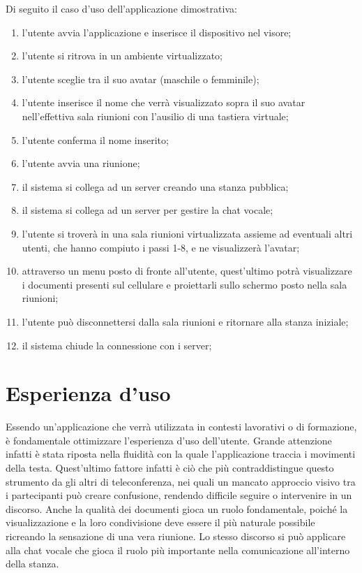 Di seguito il  caso d'uso dell'applicazione dimostrativa:
\begin{enumerate}
	\item l'utente avvia l'applicazione e inserisce il dispositivo nel visore;
	\item l'utente si ritrova in un ambiente virtualizzato;
	\item l'utente sceglie tra il suo avatar (maschile o femminile);
	\item l'utente inserisce il nome che verrà visualizzato sopra il suo avatar nell'effettiva sala riunioni con l'ausilio di una tastiera virtuale;
	\item l'utente conferma il nome inserito;
	\item l'utente avvia una riunione;
	\item il sistema si collega ad un server creando una stanza pubblica; 
	\item il sistema si collega ad un server per gestire la chat vocale;
	\item l'utente si troverà in una sala riunioni virtualizzata assieme ad eventuali altri utenti, che hanno compiuto i passi 1-8,  e ne visualizzerà l'avatar;
	\item attraverso un menu posto di fronte all'utente, quest'ultimo potrà visualizzare i documenti presenti sul cellulare e proiettarli sullo schermo posto nella sala riunioni;
	\item l'utente può disconnettersi dalla sala riunioni e ritornare alla stanza iniziale;
	\item il sistema chiude la connessione con i server;
\end{enumerate}

\section{Esperienza d'uso}
Essendo un'applicazione che verrà utilizzata in contesti lavorativi o di formazione, è fondamentale ottimizzare l'esperienza d'uso dell'utente. Grande attenzione infatti è stata riposta nella fluidità con la quale l'applicazione traccia i movimenti della testa. Quest'ultimo fattore infatti è ciò che più contraddistingue questo strumento da gli altri di teleconferenza, nei quali un mancato approccio visivo tra i partecipanti può creare confusione, rendendo difficile seguire o intervenire in un discorso. Anche la qualità dei documenti gioca un ruolo fondamentale, poiché la visualizzazione e la loro condivisione deve essere il più naturale possibile ricreando la sensazione di una vera riunione. Lo stesso discorso si può applicare alla chat vocale che gioca il ruolo più importante nella comunicazione all'interno della stanza.
